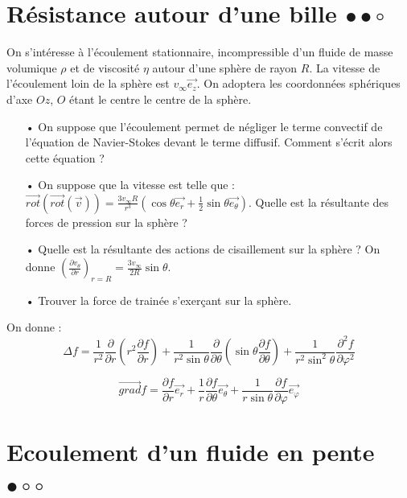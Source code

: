 \documentclass{report}
\begin{document}
\section*{Résistance autour d'une bille $\bullet\bullet\circ$}

On s'intéresse à l'écoulement stationnaire, incompressible d'un fluide de masse volumique $\rho$ et de viscosité $\eta$ autour d'une sphère de rayon $R$. La vitesse de l'écoulement loin de la sphère est $v_\infty\vec{e_z}$. On adoptera les coordonnées sphériques d'axe $Oz$, $O$ étant le centre le centre de la sphère. 

\begin{itemize}
	\item[•] On suppose que l'écoulement permet de négliger le terme convectif de l'équation de Navier-Stokes devant le terme diffusif. Comment s'écrit alors cette équation ? 
	\item[•] On suppose que la vitesse est telle que : $\vec{rot}(\vec{rot}(\vec{v}))=\frac{3v_\infty R}{r^3}\left(\cos\theta\vec{e_r}+\frac{1}{2}\sin\theta\vec{e_\theta} \right) $. Quelle est la résultante des forces de pression sur la sphère ? 
	\item[•] Quelle est la résultante des actions de cisaillement sur la sphère ? On donne $\left(\frac{\partial v_\theta}{\partial r}\right)_{r=R}=\frac{3v_\infty}{2R}\sin\theta  $.
	\item[•] Trouver la force de trainée s'exerçant sur la sphère. 
\end{itemize}

On donne : 
\begin{equation}
	\Delta f = \frac{1}{r^2}\frac{\partial}{\partial r} \left(r^2\frac{\partial f}{\partial r} \right) + \frac{1}{r^2\sin\theta}\frac{\partial}{\partial \theta} \left(\sin\theta\frac{\partial f}{\partial \theta} \right) + \frac{1}{r^2\sin^2\theta}\frac{\partial^2 f}{\partial \varphi^2} 
\end{equation}

\begin{equation}
	\vec{grad} f = \frac{\partial f}{\partial r} \vec{e_r} + \frac{1}{r}\frac{\partial f}{\partial \theta}\vec{e_\theta} + \frac{1}{r\sin\theta}\frac{\partial f}{\partial \varphi}\vec{e_\varphi}
\end{equation}

\newpage

\section*{Ecoulement d'un fluide en pente $\bullet\circ\circ$}
\end{document}
